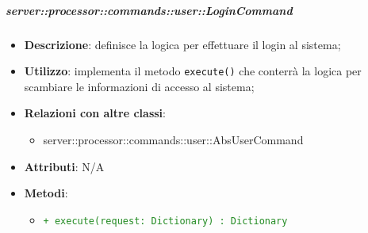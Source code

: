         \subparagraph{server::processor::commands::user::LoginCommand} %
        \label{subp:bdsm_app_server_processor_commands_user_LoginCommand}
        \begin{itemize}
          \item \textbf{Descrizione}: definisce la logica per effettuare il login al sistema;
          \item \textbf{Utilizzo}: implementa il metodo \texttt{execute()} che conterrà la logica per scambiare le informazioni di accesso al sistema;
          \item \textbf{Relazioni con altre classi}:
            \begin{itemize}
              \item server::processor::commands::user::AbsUserCommand
            \end{itemize}
          \item \textbf{Attributi}: N/A
          \item \textbf{Metodi}:
          \begin{itemize}
              \item \textcolor{forestgreen}{\texttt{+ execute(request: Dictionary) : Dictionary}}
          \end{itemize}
        \end{itemize}

